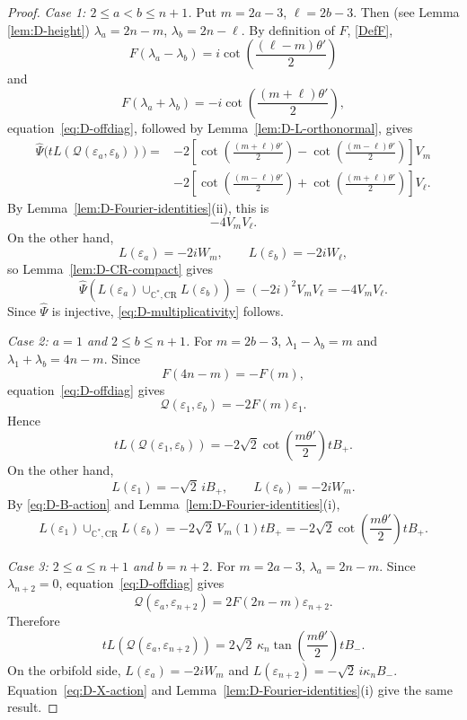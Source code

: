 \documentclass[a4paper,reqno]{amsart}
\theoremstyle{plain} %
\theoremstyle{definition} %
\theoremstyle{remark} %
\newcommand{\1}{\mathds{1}}   %
\begin{document}
\begin{proof}
\medskip
\noindent
\textit{Case 1: \(2\le a<b\le n+1\).}
Put $m=2a-3$, $\ell=2b-3$. Then (see Lemma \ref{lem:D-height}) $\lambda_a=2n-m$, $\lambda_b=2n-\ell$.
By definition of $F$, \eqref{DefF},
\[
F(\lambda_a-\lambda_b)
=
i\cot\left(\frac{(\ell-m)\theta'}{2}\right)
\]
and
\[
F(\lambda_a+\lambda_b)
=
-i\cot\left(\frac{(m+\ell)\theta'}{2}\right),
\]
equation~\eqref{eq:D-offdiag}, followed by
Lemma~\ref{lem:D-L-orthonormal}, gives
\begin{align*}
\widehat\Psi
\bigl(
tL(\mathcal Q(\varepsilon_a,\varepsilon_b))
\bigr)
={}&
-2
\left[
\cot\left(\frac{(m+\ell)\theta'}{2}\right)
-
\cot\left(\frac{(m-\ell)\theta'}{2}\right)
\right]V_m
\\
&-
2
\left[
\cot\left(\frac{(m-\ell)\theta'}{2}\right)
+
\cot\left(\frac{(m+\ell)\theta'}{2}\right)
\right]V_\ell.
\end{align*}
By Lemma~\ref{lem:D-Fourier-identities}(ii), this is
\[
-4V_mV_\ell.
\]
On the other hand,
\[
L(\varepsilon_a)=-2iW_m,
\qquad
L(\varepsilon_b)=-2iW_\ell,
\]
so Lemma~\ref{lem:D-CR-compact} gives
\[
\widehat\Psi
\left(
L(\varepsilon_a)
\cup_{\mathbb C^*,\mathrm{CR}}
L(\varepsilon_b)
\right)
=
(-2i)^2V_mV_\ell
=
-4V_mV_\ell.
\]
Since \(\widehat\Psi\) is injective,
\eqref{eq:D-multiplicativity} follows.

\medskip
\noindent
\textit{Case 2: \(a=1\) and \(2\le b\le n+1\).}
For $m=2b-3$, $\lambda_1-\lambda_b=m$ and $\lambda_1+\lambda_b=4n-m$.
Since
\[
F(4n-m)=-F(m),
\]
equation~\eqref{eq:D-offdiag} gives
\[
\mathcal Q(\varepsilon_1,\varepsilon_b)
=
-2F(m)\varepsilon_1.
\]
Hence
\[
tL(\mathcal Q(\varepsilon_1,\varepsilon_b))
=
-2\sqrt2
\cot\left(\frac{m\theta'}{2}\right)tB_+.
\]
On the other hand,
\[
L(\varepsilon_1)=-\sqrt2\,iB_+,
\qquad
L(\varepsilon_b)=-2iW_m.
\]
By \eqref{eq:D-B-action} and
Lemma~\ref{lem:D-Fourier-identities}(i),
\[
L(\varepsilon_1)
\cup_{\mathbb C^*,\mathrm{CR}}
L(\varepsilon_b)
=
-2\sqrt2\,
V_m(1)tB_+
=
-2\sqrt2
\cot\left(\frac{m\theta'}{2}\right)tB_+.
\]

\medskip
\noindent
\textit{Case 3: \(2\le a\le n+1\) and \(b=n+2\).}
For $m=2a-3$, $\lambda_a=2n-m$. Since $\lambda_{n+2}=0$, equation~\eqref{eq:D-offdiag} gives
\[
\mathcal Q(\varepsilon_a,\varepsilon_{n+2})
=
2F(2n-m)\varepsilon_{n+2}.
\]
Therefore
\[
tL(\mathcal Q(\varepsilon_a,\varepsilon_{n+2}))
=
2\sqrt2\, \kappa_n
\tan\left(\frac{m\theta'}{2}\right)tB_-.
\]
On the orbifold side, $L(\varepsilon_a)=-2iW_m$ and $L(\varepsilon_{n+2})=-\sqrt2\, i\kappa_nB_-$.
Equation~\eqref{eq:D-X-action} and
Lemma~\ref{lem:D-Fourier-identities}(i) give the same result.


\end{proof}
\end{document}
